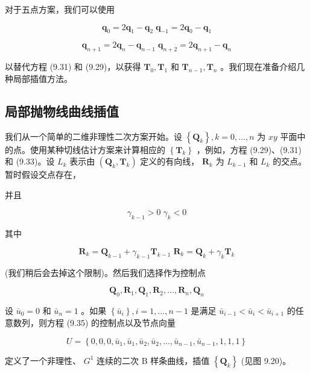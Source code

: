 \documentclass[../main.tex]{subfiles}
\begin{document}
对于五点方案，我们可以使用

\[
{\mathbf{q}}_{0} = 2{\mathbf{q}}_{1} - {\mathbf{q}}_{2}\;{\mathbf{q}}_{-1} = 2{\mathbf{q}}_{0} - {\mathbf{q}}_{1}
\]

\[
{\mathbf{q}}_{n + 1} = 2{\mathbf{q}}_{n} - {\mathbf{q}}_{n - 1}\;{\mathbf{q}}_{n + 2} = 2{\mathbf{q}}_{n + 1} - {\mathbf{q}}_{n} \tag{9.33}
\]

以替代方程 (9.31) 和 (9.29)，以获得 \({\mathbf{T}}_{0},{\mathbf{T}}_{1}\) 和 \({\mathbf{T}}_{n - 1},{\mathbf{T}}_{n}\) 。我们现在准备介绍几种局部插值方法。



\subsection{局部抛物线曲线插值}

我们从一个简单的二维非理性二次方案开始。设 \(\left\{  {\mathbf{Q}}_{k}\right\}  ,k = 0,\ldots ,n\) 为 \({xy}\) 平面中的点。使用某种切线估计方案来计算相应的 \(\left\{  {\mathbf{T}}_{k}\right\}\) ，例如，方程 (9.29)、(9.31) 和 (9.33)。设 \({L}_{k}\) 表示由 \(\left( {{\mathbf{Q}}_{k},{\mathbf{T}}_{k}}\right)\) 定义的有向线， \({\mathbf{R}}_{k}\) 为 \({L}_{k - 1}\) 和 \({L}_{k}\) 的交点。暂时假设交点存在，

并且

\[
{\gamma }_{k - 1} > 0\;{\gamma }_{k} < 0 \tag{9.34}
\]

其中

\[
{\mathbf{R}}_{k} = {\mathbf{Q}}_{k - 1} + {\gamma }_{k - 1}{\mathbf{T}}_{k - 1}\;{\mathbf{R}}_{k} = {\mathbf{Q}}_{k} + {\gamma }_{k}{\mathbf{T}}_{k}
\]

(我们稍后会去掉这个限制)。然后我们选择作为控制点

\[
{\mathbf{Q}}_{0},{\mathbf{R}}_{1},{\mathbf{Q}}_{1},{\mathbf{R}}_{2},\ldots ,{\mathbf{R}}_{n},{\mathbf{Q}}_{n} \tag{9.35}
\]

设 \({\bar{u}}_{0} = 0\) 和 \({\bar{u}}_{n} = 1\) 。如果 \(\left\{  {\bar{u}}_{i}\right\}  ,i = 1,\ldots ,n - 1\) 是满足 \({\bar{u}}_{i - 1} < {\bar{u}}_{i} < {\bar{u}}_{i + 1}\) 的任意数列，则方程 (9.35) 的控制点以及节点向量

\[
U = \left\{  {0,0,0,{\bar{u}}_{1},{\bar{u}}_{1},{\bar{u}}_{2},{\bar{u}}_{2},\ldots ,{\bar{u}}_{n - 1},{\bar{u}}_{n - 1},1,1,1}\right\}   \tag{9.36}
\]

定义了一个非理性、 \({G}^{1}\) 连续的二次 B 样条曲线，插值 \(\left\{  {\mathbf{Q}}_{k}\right\}\) (见图 9.20)。
\end{document}
